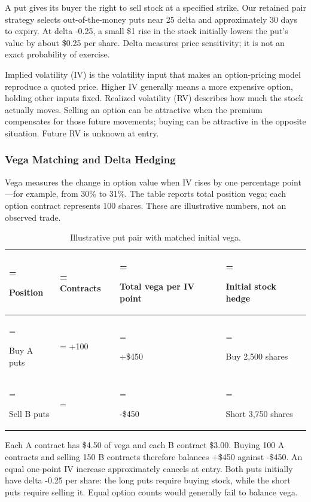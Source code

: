 A put gives its buyer the right to sell stock at a specified strike. Our retained pair strategy selects out-of-the-money puts near 25 delta and approximately 30 days to expiry. At delta -0.25, a small \$1 rise in the stock initially lowers the put's value by about \$0.25 per share. Delta measures price sensitivity; it is not an exact probability of exercise.


Implied volatility (IV) is the volatility input that makes an option-pricing model reproduce a quoted price. Higher IV generally means a more expensive option, holding other inputs fixed. Realized volatility (RV) describes how much the stock actually moves. Selling an option can be attractive when the premium compensates for those future movements; buying can be attractive in the opposite situation. Future RV is unknown at entry.


\subsubsection*{Vega Matching and Delta Hedging}

Vega measures the change in option value when IV rises by one percentage point---for example, from 30\% to 31\%. The table reports total position vega; each option contract represents 100 shares. These are illustrative numbers, not an observed trade.


\begin{table}[H]\centering\small
\caption{Illustrative put pair with matched initial vega.}
\setlength{\tabcolsep}{4pt}\renewcommand{\arraystretch}{1.18}
\begin{tabularx}{\textwidth}{@{}>{\hsize=0.84375\hsize\linewidth=\hsize\raggedright\arraybackslash}X>{\hsize=0.58594\hsize\linewidth=\hsize\raggedleft\arraybackslash}X>{\hsize=1.21094\hsize\linewidth=\hsize\raggedright\arraybackslash}X>{\hsize=1.35938\hsize\linewidth=\hsize\raggedright\arraybackslash}X@{}}\toprule
\textbf{Position} & \textbf{Contracts} & \textbf{Total vega per IV point} & \textbf{Initial stock hedge}\\\midrule
Buy A puts & +100 & +\$450 & Buy 2,500 shares\\
Sell B puts & -150 & -\$450 & Short 3,750 shares\\
\bottomrule\end{tabularx}\end{table}

Each A contract has \$4.50 of vega and each B contract \$3.00. Buying 100 A contracts and selling 150 B contracts therefore balances +\$450 against -\$450. An equal one-point IV increase approximately cancels at entry. Both puts initially have delta -0.25 per share: the long puts require buying stock, while the short puts require selling it. Equal option counts would generally fail to balance vega.


